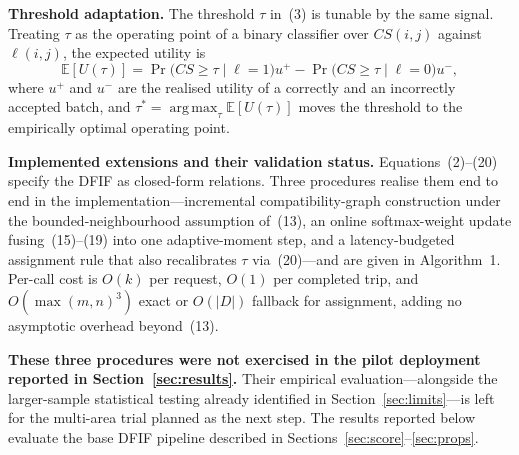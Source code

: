 \documentclass[conference]{IEEEtran}
\DeclareMathOperator*{\argmax}{arg\,max}
\begin{document}
\textbf{Threshold adaptation.} The threshold $\tau$ in~(3) is tunable by the
same signal. Treating $\tau$ as the operating point of a binary classifier
over $CS(i,j)$ against $\ell(i,j)$, the expected utility is
\begin{equation}
\mathbb{E}[U(\tau)]=\Pr\bigl(CS\ge\tau\mid\ell=1\bigr)u^{+}
 -\Pr\bigl(CS\ge\tau\mid\ell=0\bigr)u^{-},
\end{equation}
where $u^{+}$ and $u^{-}$ are the realised utility of a correctly and an
incorrectly accepted batch, and $\tau^{*}=\argmax_\tau\mathbb{E}[U(\tau)]$
moves the threshold to the empirically optimal operating point.

\textbf{Implemented extensions and their validation status.}
\label{sec:algs}
Equations~(2)--(20) specify the DFIF as closed-form relations. Three
procedures realise them end to end in the implementation---incremental
compatibility-graph construction under the bounded-neighbourhood assumption
of~(13), an online softmax-weight update fusing~(15)--(19) into one
adaptive-moment step, and a latency-budgeted assignment rule that also
recalibrates $\tau$ via~(20)---and are given in Algorithm~1. Per-call cost is
$O(k)$ per request, $O(1)$ per completed trip, and $O(\max(m,n)^3)$ exact or
$O(|D|)$ fallback for assignment, adding no asymptotic overhead beyond~(13).

\textbf{These three procedures were not exercised in the pilot deployment
reported in Section~\ref{sec:results}.} Their empirical evaluation---alongside
the larger-sample statistical testing already identified in
Section~\ref{sec:limits}---is left for the multi-area trial planned as the
next step. The results reported below evaluate the base DFIF pipeline
described in Sections~\ref{sec:score}--\ref{sec:props}.
\end{document}
